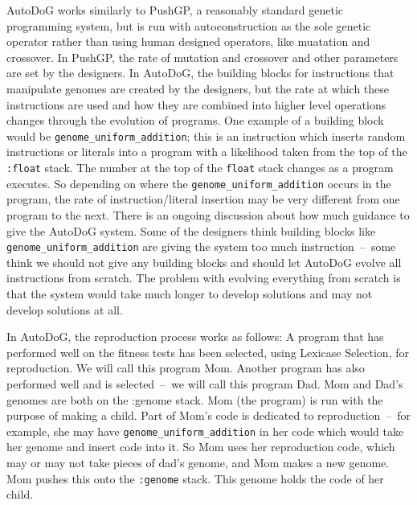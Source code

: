 \documentclass{sig-alternate}
\begin{document}
AutoDoG works similarly to PushGP, a reasonably standard genetic programming system, but is run with autoconstruction as the sole genetic operator rather than using human designed operators, like muatation and crossover. In PushGP, the rate of mutation and crossover and other parameters are set by the designers. In AutoDoG, the building blocks for instructions that manipulate genomes are created by the designers, but the rate at which these instructions are used and how they are combined into higher level operations changes through the evolution of programs. One example of a building block would be  \texttt{genome\_uniform\_addition}; this is an instruction which inserts random instructions or literals into a program with a likelihood taken from the top of the \texttt{:float} stack. The number at the top of the \texttt{float} stack changes as a program executes. So depending on where the \texttt{genome\_uniform\_addition} occurs in the program, the rate of instruction/literal insertion may be very different from one program to the next. There is an ongoing discussion about how much guidance to give the AutoDoG system. Some of the designers think building blocks like \texttt{genome\_uniform\_addition} are giving the system too much instruction~--~some think we should not give any building blocks and should let AutoDoG evolve all instructions from scratch. The problem with evolving everything from scratch is that the system would take much longer to develop solutions and may not develop solutions at all.

In AutoDoG, the reproduction process works as follows:
A program that has performed well on the fitness tests has been selected, using Lexicase Selection, for reproduction. We will call this program Mom. Another program has also performed well and is selected~--~we will call this program Dad. Mom and Dad's genomes are both on the :genome stack. Mom (the program) is run with the purpose of making a child. Part of Mom's code is dedicated to reproduction~--~for example, she may have \texttt{genome\_uniform\_addition} in her code which would take her genome and insert code into it. So Mom uses her reproduction code, which may or may not take pieces of dad's genome, and Mom makes a new genome. Mom pushes this onto the \texttt{:genome} stack. This genome holds the code of her child.
\end{document}
